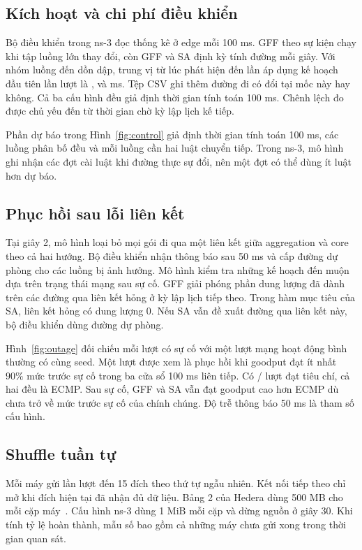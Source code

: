 \documentclass[conference,a4paper]{IEEEtran}
\begin{document}
\subsection{Kích hoạt và chi phí điều khiển}
Bộ điều khiển trong ns-3 đọc thống kê ở edge mỗi 100 ms. GFF theo sự kiện chạy khi tập luồng lớn thay đổi, còn GFF và SA định kỳ tính đường mỗi giây. Với nhóm luồng đến dồn dập, trung vị từ lúc phát hiện đến lần áp dụng kế hoạch đầu tiên lần lượt là \EventGff, \PeriodicGff{} và \PeriodicSa{} ms. Tệp CSV ghi thêm đường đi có đổi tại mốc này hay không. Cả ba cấu hình đều giả định thời gian tính toán 100 ms. Chênh lệch đo được chủ yếu đến từ thời gian chờ kỳ lập lịch kế tiếp.

Phần dự báo trong Hình~\ref{fig:control} giả định thời gian tính toán 100 ms, các luồng phân bố đều và mỗi luồng cần hai luật chuyển tiếp. Trong ns-3, mô hình ghi nhận các đợt cài luật khi đường thực sự đổi, nên một đợt có thể dùng ít luật hơn dự báo.


\subsection{Phục hồi sau lỗi liên kết}
Tại giây 2, mô hình loại bỏ mọi gói đi qua một liên kết giữa aggregation và core theo cả hai hướng. Bộ điều khiển nhận thông báo sau 50 ms và cấp đường dự phòng cho các luồng bị ảnh hưởng. Mô hình kiểm tra những kế hoạch đến muộn dựa trên trạng thái mạng sau sự cố. GFF giải phóng phần dung lượng đã dành trên các đường qua liên kết hỏng ở kỳ lập lịch tiếp theo. Trong hàm mục tiêu của SA, liên kết hỏng có dung lượng 0. Nếu SA vẫn đề xuất đường qua liên kết này, bộ điều khiển dùng đường dự phòng.

Hình~\ref{fig:outage} đối chiếu mỗi lượt có sự cố với một lượt mạng hoạt động bình thường có cùng seed. Một lượt được xem là phục hồi khi goodput đạt ít nhất \(90\%\) mức trước sự cố trong ba cửa sổ 100 ms liên tiếp. Có \RecoveryCount/\RecoveryTotal{} lượt đạt tiêu chí, cả hai đều là ECMP. Sau sự cố, GFF và SA vẫn đạt goodput cao hơn ECMP dù chưa trở về mức trước sự cố của chính chúng. Độ trễ thông báo 50 ms là tham số cấu hình.


\subsection{Shuffle tuần tự}
Mỗi máy gửi lần lượt đến 15 đích theo thứ tự ngẫu nhiên. Kết nối tiếp theo chỉ mở khi đích hiện tại đã nhận đủ dữ liệu. Bảng 2 của Hedera dùng 500 MB cho mỗi cặp máy~\cite{hedera}. Cấu hình ns-3 dùng 1 MiB mỗi cặp và dừng nguồn ở giây 30. Khi tính tỷ lệ hoàn thành, mẫu số bao gồm cả những máy chưa gửi xong trong thời gian quan sát.
\end{document}
